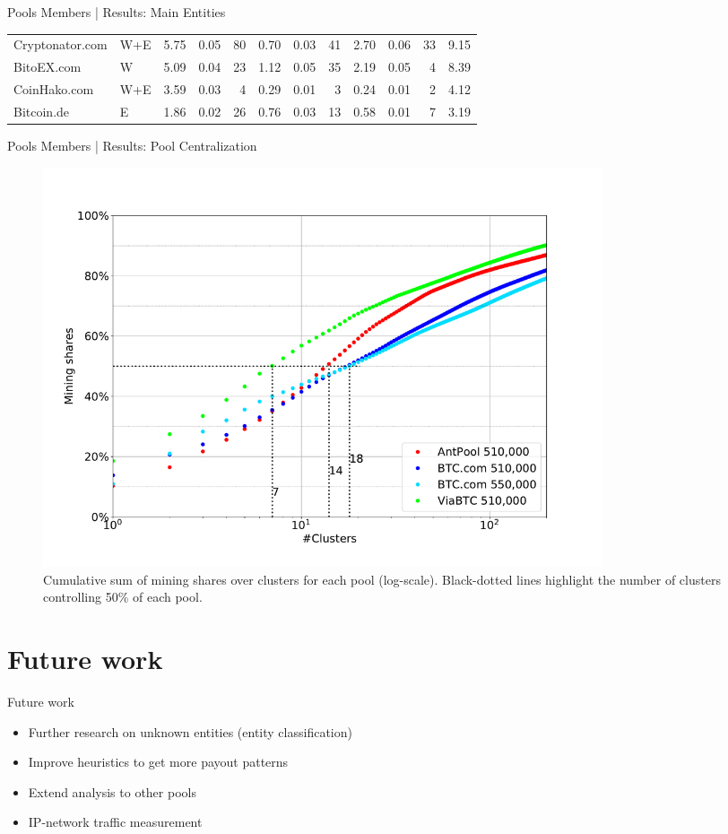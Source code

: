 \documentclass[10pt]{beamer}
\begin{document}
\begin{frame}[fragile]{Pools Members | Results: Main Entities}
\begin{table}
{\begin{tabular}{@{}llrrrrrrrrrr@{}}
            Cryptonator.com     & W+E     & 5.75    & 0.05  & 80          & 0.70    & 0.03  & 41          & 2.70    & 0.06  & 33          & 9.15      \\ 
            BitoEX.com          & W       & 5.09    & 0.04  & 23          & 1.12    & 0.05  & 35          & 2.19    & 0.05  & 4           & 8.39      \\ 
            CoinHako.com        & W+E     & 3.59    & 0.03  & 4           & 0.29    & 0.01  & 3           & 0.24    & 0.01  & 2           & 4.12      \\ 
            Bitcoin.de          & E       & 1.86    & 0.02  & 26          & 0.76    & 0.03  & 13          & 0.58    & 0.01  & 7           & 3.19      \\ \bottomrule
            \end{tabular}
        }
    \end{table} 
\end{frame}

\begin{frame}[fragile]{Pools Members | Results: Pool Centralization}
    \begin{figure}
        \includegraphics[width=0.8\textwidth]{images/pool_centralization.pdf}
        \caption{Cumulative sum of mining shares over clusters for each pool (log-scale). Black-dotted lines highlight the number of clusters controlling 50\% of each pool.} \label{fig:pool_centralization}
    \end{figure}
\end{frame}

\section{Future work} 
\begin{frame}[fragile]{Future work}
    \begin{itemize}
        \item Further research on unknown entities (entity classification) 
        \item Improve heuristics to get more payout patterns
        \item Extend analysis to other pools
        \item IP-network traffic measurement
    \end{itemize}
\end{frame}
\end{document}
